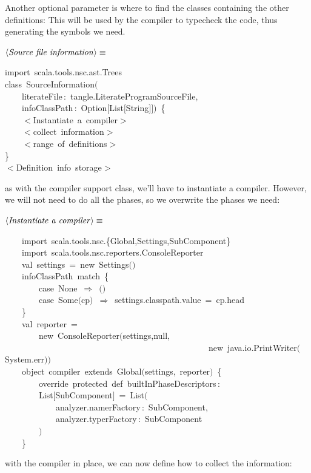 \documentclass[a4paper,12pt]{article}
\begin{document}
Another optional parameter is where to find the classes containing
the other definitions: This will be used by the compiler to typecheck
the code, thus generating the symbols we need.

$\left<\mbox{\emph{Source file information}}\right>\equiv$
\begin{program}{\vem import}~scala.tools.nsc.ast.Trees
\\{\vem class}~SourceInformation$($
\\~~~~literateFile\,{\rm :}~tangle.LiterateProgramSourceFile,
\\~~~~infoClassPath\,{\rm :}~Option$[$List$[$String$]$$]$$)$~{\small\{}
\\~~~~$<$Instantiate~a~compiler$>$
\\[0.5em]~~~~$<$collect~information$>$
\\~~~~$<$range~of~definitions$>$
\\{\small\}}
\\[0.5em]$<$Definition~info~storage$>$
\\[0.5em]\end{program}
as with the compiler support class, we'll have to instantiate
a compiler. However, we will not need to do all the phases,
so we overwrite the phases we need:

$\left<\mbox{\emph{Instantiate a compiler}}\right>\equiv$
\begin{program}~~~~{\vem import}~scala.tools.nsc.{\small\{}Global,Settings,SubComponent{\small\}}
\\~~~~{\vem import}~scala.tools.nsc.reporters.ConsoleReporter
\\[0.5em]~~~~{\vem val}~settings~=~{\vem new}~Settings$($$)$
\\~~~~infoClassPath~{\vem match}~{\small\{}
\\~~~~~~~~{\vem case}~None~$\Rightarrow$~$($$)$
\\~~~~~~~~{\vem case}~Some$($cp$)$~$\Rightarrow$~settings.classpath.value~=~cp.head
\\~~~~{\small\}}
\\[0.5em]~~~~{\vem val}~reporter~=
\\~~~~~~~~{\vem new}~ConsoleReporter$($settings,{\vem null},
\\~~~~~~~~~~~~~~~~~~~~~~~~~~~~~~~~~~~~~~~~~~~~~~~~{\vem new}~java.io.PrintWriter$($System.err$)$$)$
\\~~~~{\vem object}~compiler~{\vem extends}~Global$($settings,~reporter$)$~{\small\{}
\\~~~~~~~~{\vem override}~{\vem protected}~{\vem def}~builtInPhaseDescriptors\,{\rm :}
\\~~~~~~~~List$[$SubComponent$]$~=~List$($
\\~~~~~~~~~~~~analyzer.namerFactory\,{\rm :}~SubComponent,
\\~~~~~~~~~~~~analyzer.typerFactory\,{\rm :}~SubComponent
\\~~~~~~~~$)$
\\~~~~{\small\}}
\\[0.5em]\end{program}
with the compiler in place, we can now define how to collect the information:
\end{document}

